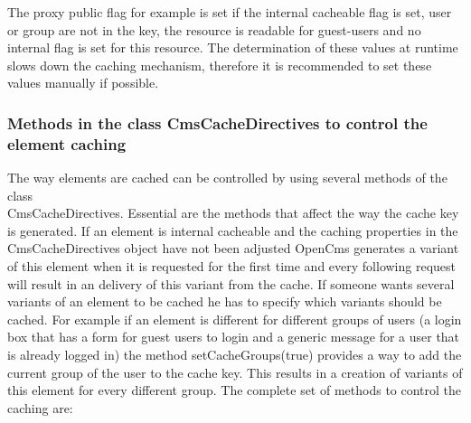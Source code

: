 \begin{itemize}
The proxy pub\-lic flag for ex\-am\-ple is set if the in\-ter\-nal cache\-able flag is set, user 
or group
are not in the key, the resource is readable for guest-users and no internal flag is set for 
this resource.
The determination of these values at runtime slows down the caching mechanism, therefore it is
recommended to set these values manually if possible.

\end{itemize}
\subsubsection{Methods in the class CmsCacheDirectives to control the element caching} 
The way elements are cached can be controlled by using several methods of the 
class \\
{\class CmsCacheDirectives}. Essential are the methods that affect the way the cache 
key is generated. If an element is internal cacheable and the caching properties in the\\
{\class CmsCacheDirectives} object have not been adjusted OpenCms generates a variant of this 
element when it is requested for the first time and every following request will 
result in an delivery of this variant from the cache. If someone wants several
variants of an element to be cached he has to specify which variants should be cached. 
For example if an element is different for different groups of users (a login box that 
has a form for guest users to login and a generic message for a user that is already logged 
in) the method {\meth setCacheGroups(true)} provides a way to add the current group of the user to
the cache key. This results in a creation of variants of this element for every different 
group. The complete set of methods to control the caching are:

